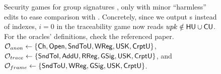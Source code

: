\begin{figure}[ht!]
  \centering
  \caption{Security games for group signatures \cite{bsz05}, only with minor    
    ``harmless'' edits to ease comparison with \CUASGS. Concretely, since we
    output {\upk}s instead of indexes, $i=0$ in the traceability game now reads
    $upk \notin \mathsf{HU} \cup \mathsf{CU}$. For the oracles' definitions, check the
    referenced paper.
    $\mathcal{O}_{anon} \gets \lbrace \mathsf{Ch},\mathsf{Open},\mathsf{SndToU},
    \mathsf{WReg},\mathsf{USK},\mathsf{CrptU} \rbrace$,
    $\mathcal{O}_{trace} \gets \lbrace \mathsf{SndToI},\mathsf{AddU},
    \mathsf{RReg},\mathsf{GSig},\mathsf{USK},\mathsf{CrptU} \rbrace$,
    and $\mathcal{O}_{frame} \gets \lbrace \mathsf{SndToU},\mathsf{WReg},
    \mathsf{GSig},\mathsf{USK},\mathsf{CrptU} \rbrace$.
  }
  \label{fig:model-gs}  
\end{figure}

